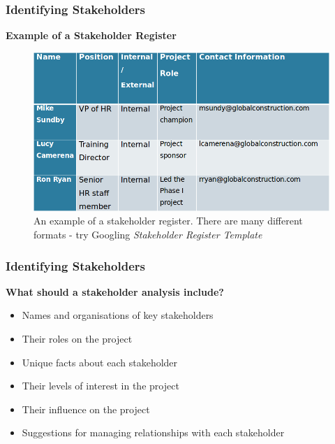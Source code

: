 \documentclass[aspectratio=169]{beamer}
\begin{document}
\begin{frame}
\frametitle{Identifying Stakeholders}
\textbf{Example of a Stakeholder Register}\\
\begin{figure}
\includegraphics[scale=0.45]{stakeholder_reg}
\caption{An example of a stakeholder register. There are many different formats - try Googling \textit{Stakeholder Register Template}}
\end{figure}
\end{frame}

\begin{frame}
\frametitle{Identifying Stakeholders}
\textbf{What should a stakeholder analysis include?}
\vspace{0.5cm}
\begin{itemize}
\item Names and organisations of key stakeholders
\item Their roles on the project
\item Unique facts about each stakeholder
\item Their levels of interest in the project
\item Their influence on the project
\item Suggestions for managing relationships with each stakeholder
\end{itemize}
\end{frame}
\end{document}
